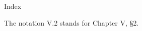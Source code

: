 \clearpage
{}%
\global\let\currentseccode\empty
\global\let\pagefirstsec\empty
\renewcommand{\chaptertitle}{}%
\def\currentsectitle{}%
\thispagestyle{emptyhead}%
{}%
\label{fm:index}%
%
\begin{center}{\Large Index}\end{center}%
\vspace{0.5\baselineskip}%
\noindent\small The notation V.2 stands for Chapter V, §2.%
\vspace{0.8\baselineskip}%
\par

